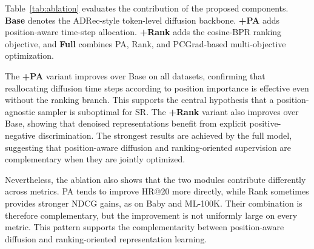\documentclass[runningheads,a4paper]{llncs}
\begin{document}
Table~\ref{tab:ablation} evaluates the contribution of the proposed components. \textbf{Base} denotes the ADRec-style token-level diffusion backbone. \textbf{+PA} adds position-aware time-step allocation. \textbf{+Rank} adds the cosine-BPR ranking objective, and \textbf{Full} combines PA, Rank, and PCGrad-based multi-objective optimization.

The \textbf{+PA} variant improves over Base on all datasets, confirming that reallocating diffusion time steps according to position importance is effective even without the ranking branch. This supports the central hypothesis that a position-agnostic sampler is suboptimal for SR. The \textbf{+Rank} variant also improves over Base, showing that denoised representations benefit from explicit positive-negative discrimination. The strongest results are achieved by the full model, suggesting that position-aware diffusion and ranking-oriented supervision are complementary when they are jointly optimized.

Nevertheless, the ablation also shows that the two modules contribute differently across metrics. PA tends to improve HR@20 more directly, while Rank sometimes provides stronger NDCG gains, as on Baby and ML-100K. Their combination is therefore complementary, but the improvement is not uniformly large on every metric. This pattern supports the complementarity between position-aware diffusion and ranking-oriented representation learning.

\begin{table}[!htbp]
    \centering
    \caption{Ablation results of PAID-Rank (HR@20 / NDCG@20, \%).}
    \label{tab:ablation}
    \scriptsize
    \setlength{\tabcolsep}{6pt}
    \renewcommand{\arraystretch}{1.08}
\end{table}
\end{document}
